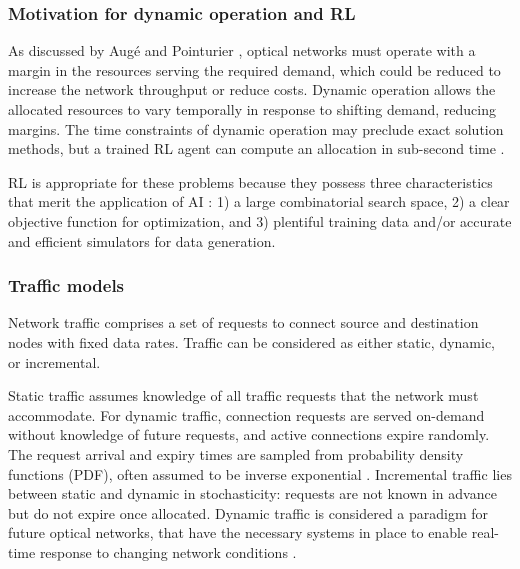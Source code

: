 \subsubsection*{Motivation for dynamic operation and RL}
As discussed by Aug\'e \cite{auge_can_2013} and Pointurier \cite{pointurier_design_2017}, optical networks must operate with a margin in the resources serving the required demand, which could be reduced to increase the network throughput or reduce costs. Dynamic operation allows the allocated resources to vary temporally in response to shifting demand, reducing margins. The time constraints of dynamic operation may preclude exact solution methods, but a trained RL agent can compute an allocation in sub-second time \cite{di_cicco_deep_2022}.

RL is appropriate for these problems because they possess three characteristics that merit the application of AI \cite{hassabis_nobel_2024}: 1) a large combinatorial search space, 2) a clear objective function for optimization, and 3) plentiful training data and/or accurate and efficient simulators for data generation. 

\subsubsection*{Traffic models}
Network traffic comprises a set of requests to connect source and destination nodes with fixed data rates. Traffic can be considered as either static, dynamic, or incremental. 

Static traffic assumes knowledge of all traffic requests that the network must accommodate. For dynamic traffic, connection requests are served on-demand without knowledge of future requests, and active connections expire randomly. The request arrival and expiry times are sampled from probability density functions (PDF), often assumed to be inverse exponential \cite{chen_deeprmsa_2019}. Incremental traffic lies between static and dynamic in stochasticity: requests are not known in advance but do not expire once allocated. Dynamic traffic is considered a paradigm for future optical networks, that have the necessary systems in place to enable real-time response to changing network conditions \cite{lord_flexible_2022}.


